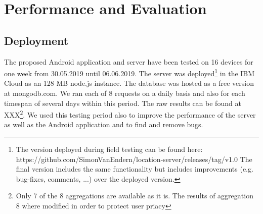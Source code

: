 \chapter{Performance and Evaluation}\label{chapter:performance}
\section{Deployment}
The proposed Android application and server have been tested on 16 devices for one week from 30.05.2019 until 06.06.2019. The server was deployed\footnote{The version deployed during field testing can be found here: https://github.com/SimonVanEndern/location-server/releases/tag/v1.0 The final version includes the same functionality but includes improvements (e.g. bug-fixes, comments, ...) over the deployed version.} in the IBM Cloud as an 128 MB node.js instance. The database was hosted as a free version at mongodb.com.
We ran each of 8 requests on a daily basis and also for each timespan of several days within this period. The raw results can be found at XXX\footnote{Only 7 of the 8 aggregations are available as it is. The results of aggregation 8 where modified in order to protect user priacy}. We used this testing period also to improve the performance of the server as well as the Android application and to find and remove bugs.

